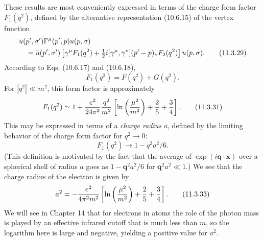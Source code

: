 These results are most conveniently expressed in terms of the charge form
factor $F_1(q^2)$, defined by the alternative representation (10.6.15) of the
vertex function
\begin{align}
&\bar u(p',\sigma')\Gamma^\mu(p',p)u(p,\sigma)\notag\\
&\quad=\bar u(p',\sigma')\left[\gamma^\mu F_1(q^2)
 +\tfrac12i[\gamma^\mu,\gamma^\nu](p'-p)_\nu F_2(q^2)\right]u(p,\sigma).
\tag{11.3.29}\label{eq:11.3.29}
\end{align}
According to Eqs. (10.6.17) and (10.6.18),
\begin{equation}
F_1(q^2)=F(q^2)+G(q^2).
\tag{11.3.30}\label{eq:11.3.30}
\end{equation}
For $|q^2|\ll m^2$, this form factor is approximately
\begin{equation}
F_1(q^2)\simeq1+{e^2\over24\pi^2}{q^2\over m^2}
 \left[\ln\left({\mu^2\over m^2}\right)+{2\over5}+{3\over4}\right].
\tag{11.3.31}\label{eq:11.3.31}
\end{equation}
This may be expressed in terms of a \emph{charge radius} $a$, defined by the
limiting behavior of the charge form factor for $q^2\longrightarrow0$:
\begin{equation}
F_1(q^2)\longrightarrow1-q^2a^2/6.
\tag{11.3.32}\label{eq:11.3.32}
\end{equation}
(This definition is motivated by the fact that the average of
$\exp(i\mathbf q\cdot\mathbf x)$ over a spherical shell of radius $a$ goes as
$1-\mathbf q^2a^2/6$ for $\mathbf q^2a^2\ll1$.) We see that the charge
radius of the electron is given by
\begin{equation}
a^2=-{e^2\over4\pi^2m^2}
 \left[\ln\left({\mu^2\over m^2}\right)+{2\over5}+{3\over4}\right].
\tag{11.3.33}\label{eq:11.3.33}
\end{equation}
We will see in Chapter 14 that for electrons in atoms the role of the photon
mass is played by an effective infrared cutoff that is much less than $m$, so
the logarithm here is large and negative, yielding a positive value for
$a^2$.
